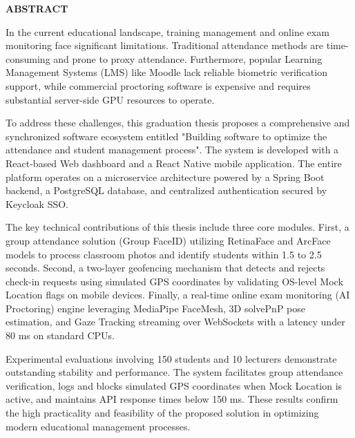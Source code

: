 \documentclass[../DoAn.tex]{subfiles}
\begin{document}
\begin{center}
    \Large{\textbf{ABSTRACT}}\\
\end{center}
\vspace{1cm}
\hspace*{1.5cm}In the current educational landscape, training management and online exam monitoring face significant limitations. Traditional attendance methods are time-consuming and prone to proxy attendance. Furthermore, popular Learning Management Systems (LMS) like Moodle lack reliable biometric verification support, while commercial proctoring software is expensive and requires substantial server-side GPU resources to operate.

\hspace*{1.5cm}To address these challenges, this graduation thesis proposes a comprehensive and synchronized software ecosystem entitled "Building software to optimize the attendance and student management process". The system is developed with a React-based Web dashboard and a React Native mobile application. The entire platform operates on a microservice architecture powered by a Spring Boot backend, a PostgreSQL database, and centralized authentication secured by Keycloak SSO.

\hspace*{1.5cm}The key technical contributions of this thesis include three core modules. First, a group attendance solution (Group FaceID) utilizing RetinaFace and ArcFace models to process classroom photos and identify students within 1.5 to 2.5 seconds. Second, a two-layer geofencing mechanism that detects and rejects check-in requests using simulated GPS coordinates by validating OS-level Mock Location flags on mobile devices. Finally, a real-time online exam monitoring (AI Proctoring) engine leveraging MediaPipe FaceMesh, 3D solvePnP pose estimation, and Gaze Tracking streaming over WebSockets with a latency under 80 ms on standard CPUs.

\hspace*{1.5cm}Experimental evaluations involving 150 students and 10 lecturers demonstrate outstanding stability and performance. The system facilitates group attendance verification, logs and blocks simulated GPS coordinates when Mock Location is active, and maintains API response times below 150 ms. These results confirm the high practicality and feasibility of the proposed solution in optimizing modern educational management processes.
\end{document}
